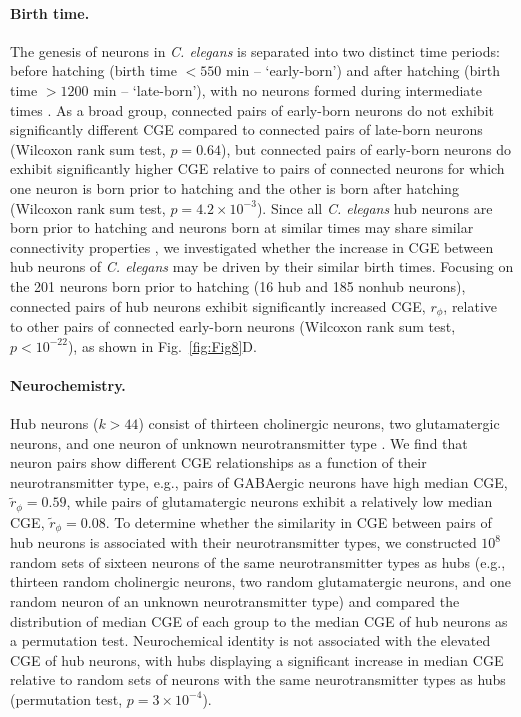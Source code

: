 \documentclass[10pt,letterpaper]{article}
\begin{document}
{\paragraph{Birth time.}
The genesis of neurons in \emph{C. elegans} is separated into two distinct time periods: before hatching (birth time $<550$ min -- `early-born') and after hatching (birth time $>1200$ min -- `late-born'), with no neurons formed during intermediate times \cite{Varier2011}.
As a broad group, connected pairs of early-born neurons do not exhibit significantly different CGE compared to connected pairs of late-born neurons (Wilcoxon rank sum test, $p = 0.64$), but connected pairs of early-born neurons do exhibit significantly higher CGE relative to pairs of connected neurons for which one neuron is born prior to hatching and the other is born after hatching (Wilcoxon rank sum test, $p = 4.2 \times 10^{-3}$).
Since all \emph{C. elegans} hub neurons are born prior to hatching \cite{Towlson2013} and neurons born at similar times may share similar connectivity properties \cite{Varier2011, Towlson2013}, we investigated whether the increase in CGE between hub neurons of \emph{C. elegans} may be driven by their similar birth times.
Focusing on the 201 neurons born prior to hatching (16 hub and 185 nonhub neurons), connected pairs of hub neurons exhibit significantly increased CGE, $r_\phi$, relative to other pairs of connected early-born neurons (Wilcoxon rank sum test, $p < 10^{-22}$), as shown in Fig.~\ref{fig:Fig8}D.

\paragraph{Neurochemistry.}
Hub neurons ($k > 44$) consist of thirteen cholinergic neurons, two glutamatergic neurons, and one neuron of unknown neurotransmitter type \cite{Pereira:2015er}.
We find that neuron pairs show different CGE relationships as a function of their neurotransmitter type, e.g., pairs of GABAergic neurons have high median CGE, $\tilde{r}_\phi = 0.59$, while pairs of glutamatergic neurons exhibit a relatively low median CGE, $\tilde{r}_\phi = 0.08$.
To determine whether the similarity in CGE between pairs of hub neurons is associated with their neurotransmitter types, we constructed $10^8$ random sets of sixteen neurons of the same neurotransmitter types as hubs (e.g., thirteen random cholinergic neurons, two random glutamatergic neurons, and one random neuron of an unknown neurotransmitter type) and compared the distribution of median CGE of each group to the median CGE of hub neurons as a permutation test.
Neurochemical identity is not associated with the elevated CGE of hub neurons, with hubs displaying a significant increase in median CGE relative to random sets of neurons with the same neurotransmitter types as hubs (permutation test, $p = 3\times10^{-4}$).

}
\end{document}
